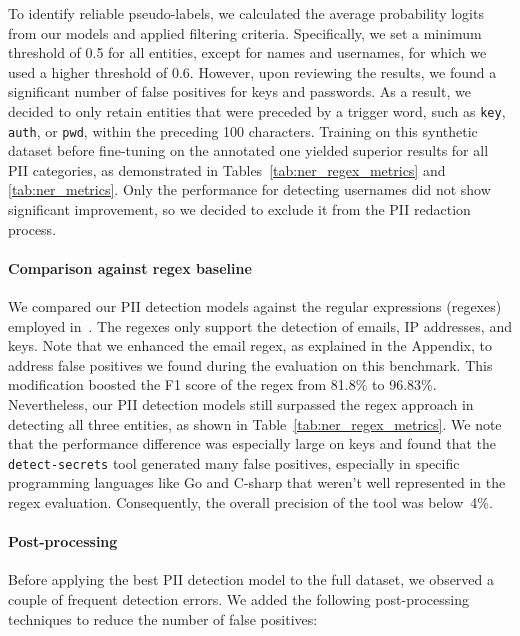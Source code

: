 To identify reliable pseudo-labels, we calculated the average probability logits from our models and applied filtering criteria. Specifically, we set a minimum threshold of 0.5 for all entities, except for names and usernames, for which we used a higher threshold of 0.6. However, upon reviewing the results, we found a significant number of false positives for keys and passwords. As a result, we decided to only retain entities that were preceded by a trigger word, such as \texttt{key}, \texttt{auth}, or \texttt{pwd}, within the preceding 100 characters. Training on this synthetic dataset before fine-tuning on the annotated one yielded superior results for all PII categories, as demonstrated in Tables~\ref{tab:ner_regex_metrics} and \ref{tab:ner_metrics}. Only the performance for detecting usernames did not show significant improvement, so we decided to exclude it from the PII redaction process. 

\paragraph{Comparison against regex baseline} We compared our PII detection models against the regular expressions (regexes) employed in~\citet{allal2023santacoder}. The regexes only support the detection of emails, IP addresses, and keys. Note that we enhanced the email regex, as explained in the Appendix, to address false positives we found during the evaluation on this benchmark. This modification boosted the F1 score of the regex from 81.8\% to 96.83\%. Nevertheless, our PII detection models still surpassed the regex approach in detecting all three entities, as shown in Table~\ref{tab:ner_regex_metrics}. We note that the performance difference was especially large on keys and found that the \texttt{detect-secrets} tool generated many false positives, especially in specific programming languages like Go and C-sharp that weren't well represented in the regex evaluation. Consequently, the overall precision of the tool was below~4\%.

\paragraph{Post-processing} Before applying the best PII detection model to the full dataset, we observed a couple of frequent detection errors. We added the following post-processing techniques to reduce the number of false positives:

